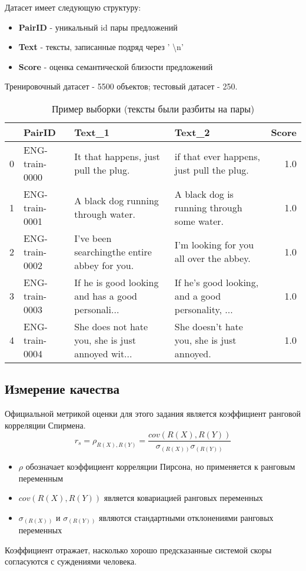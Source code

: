\documentclass[12pt]{article}
\begin{document}
Датасет имеет следующую структуру:
\begin{itemize}
    \item \textbf{PairID} - уникальный id пары предложений
    \item \textbf{Text} - тексты, записанные подряд через ' \textbackslash n'
    \item \textbf{Score} - оценка семантической близости предложений
\end{itemize}

Тренировочный датасет - 5500 объектов; тестовый датасет - 250.

\begin{table}[H]
\center
\tiny
\begin{tabular}{llllr}
\hline
{} &          PairID &                                             Text\_1 &                                             Text\_2 &  Score \\
\hline
0 &  ENG-train-0000 &               It that happens, just pull the plug. &          if that ever happens, just pull the plug. &    1.0 \\
1 &  ENG-train-0001 &                 A black dog running through water. &         A black dog is running through some water. &    1.0 \\
2 &  ENG-train-0002 &       I've been searchingthe entire abbey for you. &            I'm looking for you all over the abbey. &    1.0 \\
3 &  ENG-train-0003 &  If he is good looking and has a good personali... &  If he's good looking, and a good personality, ... &    1.0 \\
4 &  ENG-train-0004 &  She does not hate you, she is just annoyed wit... &         She doesn't hate you, she is just annoyed. &    1.0 \\
\hline
\end{tabular}
\caption{Пример выборки (тексты были разбиты на пары)}
\end{table}

\subsection{Измерение качества}
Официальной метрикой оценки для этого задания является коэффициент ранговой корреляции Спирмена.
$$
r_s = \rho_{R(X), R(Y)} = \frac{cov(R(X), R(Y))}{\sigma_{(R(X))} \sigma_{(R(Y))}}
$$
\begin{itemize}
    \item $\rho$ обозначает коэффициент корреляции Пирсона, но применяется к ранговым переменным
    \item $cov(R(X), R(Y))$ является ковариацией ранговых переменных
    \item $\sigma_{(R(X))}$ и $\sigma_{(R(Y))}$ являются стандартными отклонениями ранговых переменных
\end{itemize}
Коэффициент отражает, насколько хорошо предсказанные системой скоры согласуются с суждениями человека.
\end{document}
